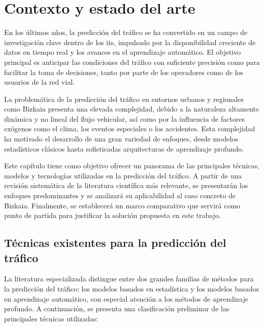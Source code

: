 \section{Contexto y estado del arte}

En los últimos años, la predicción del tráfico se ha convertido en un campo de investigación clave dentro de los \acrlong{its}, impulsado por la disponibilidad creciente de datos en tiempo real y los avances en el aprendizaje automático. El objetivo principal es anticipar las condiciones del tráfico con suficiente precisión como para facilitar la toma de decisiones, tanto por parte de los operadores como de los usuarios de la red vial.

La problemática de la predicción del tráfico en entornos urbanos y regionales como Bizkaia presenta una elevada complejidad, debido a la naturaleza altamente dinámica y no lineal del flujo vehicular, así como por la influencia de factores exógenos como el clima, los eventos especiales o los accidentes. Esta complejidad ha motivado el desarrollo de una gran variedad de enfoques, desde modelos estadísticos clásicos hasta sofisticadas arquitecturas de aprendizaje profundo.

Este capítulo tiene como objetivo ofrecer un panorama de las principales técnicas, modelos y tecnologías utilizadas en la predicción del tráfico. A partir de una revisión sistemática de la literatura científica más relevante, se presentarán los enfoques predominantes y se analizará su aplicabilidad al caso concreto de Bizkaia. Finalmente, se establecerá un marco comparativo que servirá como punto de partida para justificar la solución propuesta en este trabajo.

\subsection{Técnicas existentes para la predicción del tráfico}

La literatura especializada distingue entre dos grandes familias de métodos para la predicción del tráfico: los modelos basados en estadística y los modelos basados en aprendizaje automático, con especial atención a los métodos de aprendizaje profundo. A continuación, se presenta una clasificación preliminar de las principales técnicas utilizadas:

